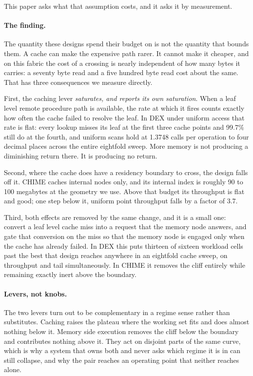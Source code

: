 \documentclass[sigconf,nonacm]{acmart}
\begin{document}
This paper asks what that assumption costs, and it asks it by measurement.

\paragraph{The finding.}
The quantity these designs spend their budget on is not the quantity that bounds
them. A cache can make the expensive path rarer. It cannot make it cheaper, and
on this fabric the cost of a crossing is nearly independent of how many bytes it
carries: a seventy byte read and a five hundred byte read cost about the same.
That has three consequences we measure directly.

First, the caching lever \emph{saturates, and reports its own saturation}. When a
leaf level remote procedure path is available, the rate at which it fires counts
exactly how often the cache failed to resolve the leaf. In DEX under uniform
access that rate is flat: every lookup misses its leaf at the first three cache
points and 99.7\% still do at the fourth, and uniform scans hold at 1.3748 calls
per operation to four decimal places across the entire eightfold sweep. More
memory is not producing a diminishing return there. It is producing no return.

Second, where the cache does have a residency boundary to cross, the design falls
off it. CHIME caches internal nodes only, and its internal index is roughly 90 to
100 megabytes at the geometry we use. Above that budget its throughput is flat and
good; one step below it, uniform point throughput falls by a factor of 3.7.

Third, both effects are removed by the same change, and it is a small one:
convert a leaf level cache miss into a request that the memory node answers, and
gate that conversion on the miss so that the memory node is engaged only when the
cache has already failed. In DEX this puts thirteen of sixteen workload cells past
the best that design reaches anywhere in an eightfold cache sweep, on throughput
and tail simultaneously. In CHIME it removes the cliff entirely while remaining
exactly inert above the boundary.

\paragraph{Levers, not knobs.}
The two levers turn out to be complementary in a regime sense rather than
substitutes. Caching raises the plateau where the working set fits and does
almost nothing below it. Memory side execution removes the cliff below the
boundary and contributes nothing above it. They act on disjoint parts of the same
curve, which is why a system that owns both and never asks which regime it is in
can still collapse, and why the pair reaches an operating point that neither
reaches alone.
\end{document}
